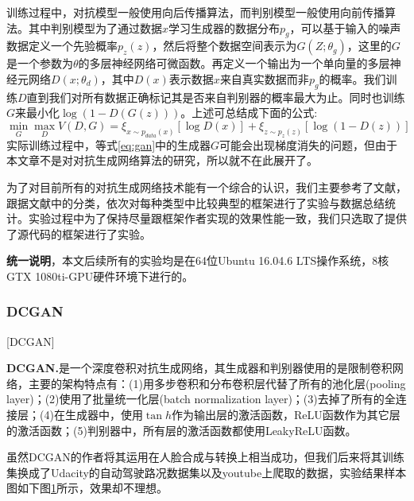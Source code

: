 训练过程中，对抗模型一般使用向后传播算法，而判别模型一般使用向前传播算法。其中判别模型为了通过数据$x$学习生成器的数据分布$p_g$，可以基于输入的噪声数据定义一个先验概率$p_z(z)$，然后将整个数据空间表示为$G(Z;\theta_g)$，这里的$G$是一个参数为$\theta$的多层神经网络可微函数。再定义一个输出为一个单向量的多层神经元网络$D(x;\theta_d)$，其中$D(x)$表示数据$x$来自真实数据而非$p_g$的概率。我们训练$D$直到我们对所有数据正确标记其是否来自判别器的概率最大为止。同时也训练$G$来最小化$\log(1-D(G(z)))$。上述可总结成下面的公式:
\begin{equation}
    \label{eq:gan}
    \min_G\max_DV(D,G)=\xi_{x\sim p_{data}(x)}[\log D(x)]+\xi_{z\sim p_z(z)}[\log(1-D(z))]
\end{equation}
实际训练过程中，等式\eqref{eq:gan}中的生成器$G$可能会出现梯度消失的问题，但由于本文章不是对对抗生成网络算法的研究，所以就不在此展开了。

为了对目前所有的对抗生成网络技术能有一个综合的认识，我们主要参考了文献\cite{gan-survey}，跟据文献中的分类，依次对每种类型中比较典型的框架进行了实验与数据总结统计。实验过程中为了保持尽量跟框架作者实现的效果性能一致，我们只选取了提供了源代码的框架进行了实验。

\textbf{统一说明}，本文后续所有的实验均是在64位Ubuntu 16.04.6 LTS操作系统，8核GTX 1080ti-GPU硬件环境下进行的。

\subsubsection{DCGAN}[DCGAN]

\textbf{DCGAN.}\cite{dcgan}\quad 是一个深度卷积对抗生成网络，其生成器和判别器使用的是限制卷积网络，主要的架构特点有：(1)用多步卷积和分布卷积层代替了所有的池化层(pooling layer)；(2)使用了批量统一化层(batch normalization layer)；(3)去掉了所有的全连接层；(4)在生成器中，使用$\tan{h}$作为输出层的激活函数，ReLU函数作为其它层的激活函数；(5)判别器中，所有层的激活函数都使用LeakyReLU函数。

虽然DCGAN的作者将其运用在人脸合成与转换上相当成功，但我们后来将其训练集换成了Udacity的自动驾驶路况数据集以及youtube上爬取的数据，实验结果样本图如下图\ref{dcgan_example}所示，效果却不理想。

\begin{figure}[t]
    \centering
    \caption{}
    \label{dcgan_example}
\end{figure}

